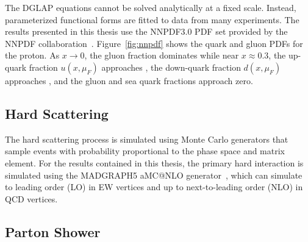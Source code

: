 The DGLAP equations cannot be solved analytically at a fixed scale.
Instead, parameterized functional forms are fitted to data from many experiments.  
The results presented in this thesis use the NNPDF3.0 PDF set provided by the NNPDF collaboration~\cite{Ball2015}.
Figure~\ref{fig:nnpdf} shows the quark and gluon PDFs for the proton.
As $x \rightarrow 0$, the gluon fraction dominates while near $x \approx 0.3$, the up-quark fraction $u(x, \mu_F)$ approaches , the down-quark fraction $d(x, \mu_F)$ approaches , and the gluon and sea quark fractions approach zero.

\subsection{Hard Scattering}

The hard scattering process is simulated using Monte Carlo generators that sample events with probability proportional to the phase space and matrix element.
For the results contained in this thesis, the primary hard interaction is simulated using the MADGRAPH5 aMC@NLO generator~\cite{Alwall2014, Frederix2012}, which can simulate to leading order (LO) in EW vertices and up to next-to-leading order (NLO) in QCD vertices.

\subsection{Parton Shower}

